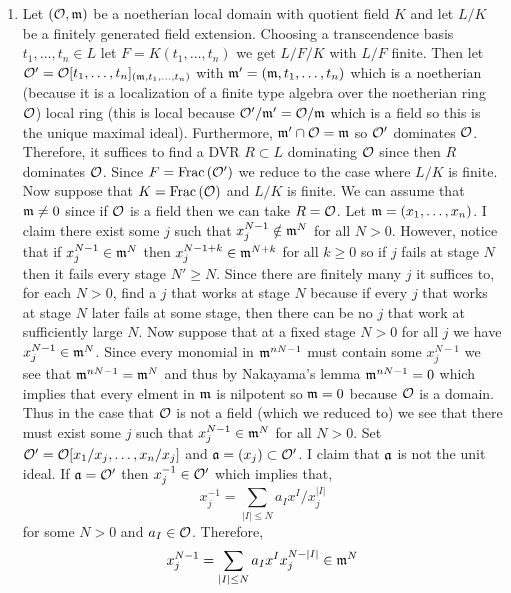 \documentclass[12pt]{article}
\begin{document}
\begin{enumerate}
\item Let $(\mathcal{O}, \mathfrak{m})$ be a noetherian local domain with quotient field $K$ and let $L / K$ be a finitely generated field extension. Choosing a transcendence basis $t_1, \dots, t_n \in L$ let $F = K(t_1, \dots, t_n)$ we get $L /F / K$ with $L / F$ finite. Then let $\mathcal{O}' = \mathcal{O}[t_1, \dots, t_n]_{(\mathfrak{m}, t_1, \dots, t_n)}$ with $\mathfrak{m}' = (\mathfrak{m}, t_1, \dots, t_n)$ which is a noetherian (because it is a localization of a finite type algebra over the noetherian ring $\mathcal{O}$) local ring (this is local because $\mathcal{O}'/\mathfrak{m}' = \mathcal{O}/\mathfrak{m}$ which is a field so this is the unique maximal ideal). Furthermore, $\mathfrak{m}' \cap \mathcal{O} = \mathfrak{m}$ so $\mathcal{O}'$ dominates $\mathcal{O}$. Therefore, it suffices to find a DVR $R \subset L$ dominating $\mathcal{O}$ since then $R$ dominates $\mathcal{O}$. Since $F = \mathrm{Frac}\left(\mathcal{O}'\right)$ we reduce to the case where $L/K$ is finite. 
\bigskip\\
Now suppose that $K = \mathrm{Frac}\left(\mathcal{O}\right)$ and $L/K$ is finite. We can assume that $\mathfrak{m} \neq 0$ since if $\mathcal{O}$ is a field then we can take $R = \mathcal{O}$. Let $\mathfrak{m} = (x_1, \dots, x_n)$. I claim there exist some $j$ such that $x_j^{N-1} \notin \mathfrak{m}^N$ for all $N > 0$. However, notice that if $x_j^{N-1} \in \mathfrak{m}^N$ then $x_j^{N - 1 + k} \in \mathfrak{m}^{N+k}$ for all $k \ge 0$ so if $j$ fails at stage $N$ then it fails every stage $N' \ge N$. Since there are finitely many $j$ it suffices to, for each $N > 0$, find a $j$ that works at stage $N$ because if every $j$ that works at stage $N$ later fails at some stage, then there can be no $j$ that work at sufficiently large $N$. Now suppose that at a fixed stage $N > 0$ for all $j$ we have $x_j^{N-1} \in \mathfrak{m}^N$. Since every monomial in $\mathfrak{m}^{nN-1}$ must contain some $x_j^{N-1}$ we see that $\mathfrak{m}^{nN-1} = \mathfrak{m}^N$ and thus by Nakayama's lemma $\mathfrak{m}^{nN-1} = 0$ which implies that every elment in $\mathfrak{m}$ is nilpotent so $\mathfrak{m} = 0$ because $\mathcal{O}$ is a domain. Thus in the case that $\mathcal{O}$ is not a field (which we reduced to) we see that there must exist some $j$ such that $x_j^{N-1} \in \mathfrak{m}^N$ for all $N > 0$. Set $\mathcal{O}' = \mathcal{O}[x_1/x_j, \dots, x_n/x_j]$ and $\mathfrak{a} = (x_j) \subset \mathcal{O}'$. I claim that $\mathfrak{a}$ is not the unit ideal. If $\mathfrak{a} = \mathcal{O}'$ then $x_j^{-1} \in \mathcal{O}'$ which implies that,
\[ x_j^{-1} = \sum_{|I| \le N} a_I x^I/x_j^{|I|} \]
for some $N > 0$ and $a_I \in \mathcal{O}$. Therefore,
\[ x_j^{N-1} = \sum_{|I| \le N} a_I x^I x_j^{N - |I|} \in \mathfrak{m}^N \]

\end{enumerate}
\end{document}
